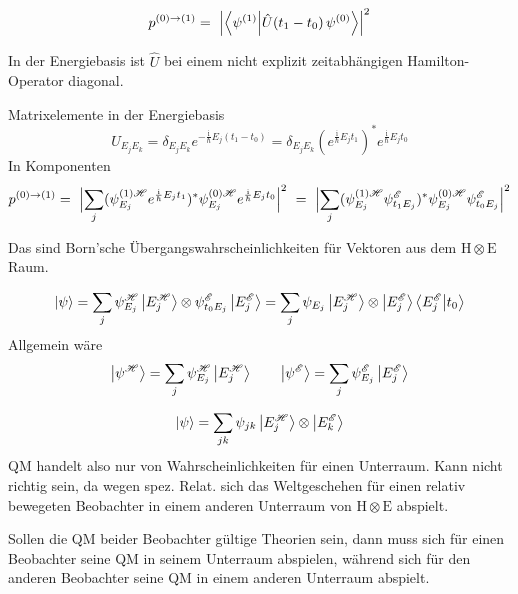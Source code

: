 \documentclass[12pt]{article}
\begin{document}
\begin{equation} 
\label{eq:conditional_probability}
p^{(0)\rightarrow(1)} =\ \Bigl| \bra{\psi^{(1)}}\ket{\hat{U}(t_1-t_0)\,\psi^{(0)}} \Bigr|^2
\end{equation}

In der Energiebasis ist $\hat{U}$ bei einem nicht explizit zeitabhängigen Hamilton-Operator diagonal.

Matrixelemente in der Energiebasis
\begin{equation} 
U_{E_j E_k} = \delta_{E_j E_k} e^{-\frac{\mathrm{i}}{\hbar}E_j(t_1-t_0)}
= 
\delta_{E_j E_k}(e^{\frac{\mathrm{i}}{\hbar}E_j t_1})^* e^{\frac{\mathrm{i}}{\hbar}E_j t_0}
\end{equation}
In Komponenten
\begin{equation} 
p^{(0)\rightarrow(1)} =\ 
\Bigl| \sum_j
(\psi_{E_j}^{(1)\mathscr{H}} e^{\frac{\mathrm{i}}{\hbar}E_j t_1})^*
\psi_{E_j}^{(0)\mathscr{H}} e^{\frac{\mathrm{i}}{\hbar}E_j t_0}
\Bigr|^2
\ = \ 
\Bigl| \sum_j
(\psi_{E_j}^{(1)\mathscr{H}} \psi_{t_1 E_j}^{\mathscr{E}})^*
\psi_{E_j}^{(0)\mathscr{H}} \psi_{t_0 E_j}^{\mathscr{E}}
\Bigr|^2
\end{equation}

Das sind Born'sche Übergangswahrscheinlichkeiten für Vektoren aus dem $\mathrm{H}\otimes\mathrm{E}$ Raum. 

\begin{equation}
\ket{\psi} = \sum_j \psi_{E_j}^\mathscr{H} \ket{E_j^\mathscr{H}} 
\otimes \psi_{t_0 E_j}^\mathscr{E} \ket{E_j^\mathscr{E}}
= \sum_j \psi_{E_j} \ket{E_j^{\mathscr{H}}} \otimes \ket{E_j^{\mathscr{E}}} \bra{E_j^{\mathscr{E}}}\ket{t_0}
\end{equation}
Allgemein wäre
\begin{equation}
\ket{\psi^\mathscr{H}} = \sum_j \psi_{E_j}^\mathscr{H} \ket{E_j^\mathscr{H}}
\quad\quad
\ket{\psi^\mathscr{E}} = \sum_j \psi_{E_j}^\mathscr{E} \ket{E_j^\mathscr{E}}
\end{equation}

\begin{equation}
\ket{\psi} = \sum_{jk} \psi_{jk} \ket{E_j^\mathscr{H}} \otimes \ket{E_k^{\mathscr{E}}}
\end{equation}
QM handelt also nur von Wahrscheinlichkeiten für einen Unterraum.
Kann nicht richtig sein, da wegen spez. Relat. sich das Weltgeschehen für einen relativ bewegeten Beobachter in einem anderen Unterraum von $\mathrm{H}\otimes\mathrm{E}$ abspielt.

Sollen die QM beider Beobachter gültige Theorien sein, dann muss sich für einen Beobachter seine QM in seinem Unterraum abspielen, während sich für den anderen Beobachter seine QM in einem anderen Unterraum abspielt. 
\end{document}
